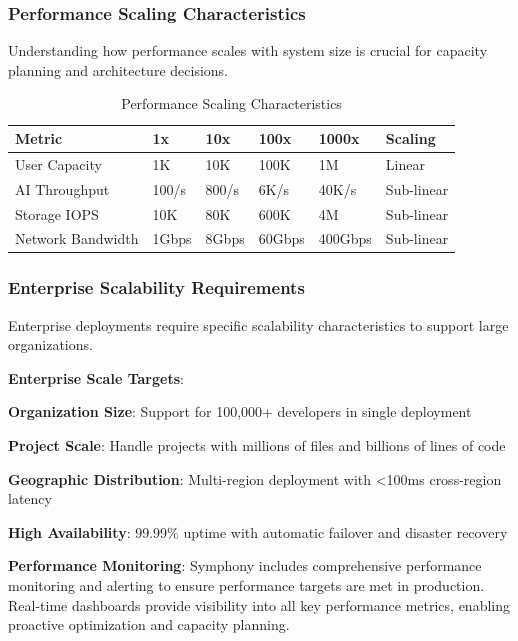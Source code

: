 \subsubsection*{Performance Scaling Characteristics}

Understanding how performance scales with system size is crucial for capacity planning and architecture decisions.

\begin{table}[h]
\centering
\caption{Performance Scaling Characteristics}
\label{tab:scaling-performance}
\begin{tabular}{@{}llllll@{}}
\toprule
\textbf{Metric} & \textbf{1x} & \textbf{10x} & \textbf{100x} & \textbf{1000x} & \textbf{Scaling} \\
\midrule
User Capacity & 1K & 10K & 100K & 1M & Linear \\
AI Throughput & 100/s & 800/s & 6K/s & 40K/s & Sub-linear \\
Storage IOPS & 10K & 80K & 600K & 4M & Sub-linear \\
Network Bandwidth & 1Gbps & 8Gbps & 60Gbps & 400Gbps & Sub-linear \\
\bottomrule
\end{tabular}
\end{table}

\subsubsection*{Enterprise Scalability Requirements}

Enterprise deployments require specific scalability characteristics to support large organizations.

\textbf{Enterprise Scale Targets}:
\begin{compactlist}
    \item \textbf{Organization Size}: Support for 100,000+ developers in single deployment
    \item \textbf{Project Scale}: Handle projects with millions of files and billions of lines of code
    \item \textbf{Geographic Distribution}: Multi-region deployment with <100ms cross-region latency
    \item \textbf{High Availability}: 99.99\% uptime with automatic failover and disaster recovery
\end{compactlist}

\begin{successbox}
\textbf{Performance Monitoring}: Symphony includes comprehensive performance monitoring and alerting to ensure performance targets are met in production. Real-time dashboards provide visibility into all key performance metrics, enabling proactive optimization and capacity planning.
\end{successbox}

